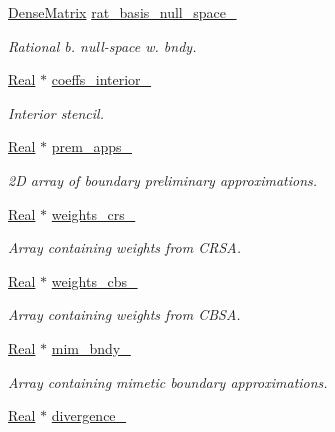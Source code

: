 \begin{DoxyCompactItemize}
\hyperlink{classmtk_1_1DenseMatrix}{Dense\+Matrix} \hyperlink{classmtk_1_1Div1D_a4f0f5589f13024b7e0edc2ac19649f9b}{rat\+\_\+basis\+\_\+null\+\_\+space\+\_\+}
\begin{DoxyCompactList}\small\item\em Rational b. null-\/space w. bndy. \end{DoxyCompactList}\item 
\hyperlink{group__c01-roots_gac080bbbf5cbb5502c9f00405f894857d}{Real} $\ast$ \hyperlink{classmtk_1_1Div1D_a7c7688d8ac25120587353ece4e93a13a}{coeffs\+\_\+interior\+\_\+}
\begin{DoxyCompactList}\small\item\em Interior stencil. \end{DoxyCompactList}\item 
\hyperlink{group__c01-roots_gac080bbbf5cbb5502c9f00405f894857d}{Real} $\ast$ \hyperlink{classmtk_1_1Div1D_ab51ff3db86a874604d6c756ab6770950}{prem\+\_\+apps\+\_\+}
\begin{DoxyCompactList}\small\item\em 2\+D array of boundary preliminary approximations. \end{DoxyCompactList}\item 
\hyperlink{group__c01-roots_gac080bbbf5cbb5502c9f00405f894857d}{Real} $\ast$ \hyperlink{classmtk_1_1Div1D_ad36dcfade921f0488fe3edaecc17bd75}{weights\+\_\+crs\+\_\+}
\begin{DoxyCompactList}\small\item\em Array containing weights from C\+R\+S\+A. \end{DoxyCompactList}\item 
\hyperlink{group__c01-roots_gac080bbbf5cbb5502c9f00405f894857d}{Real} $\ast$ \hyperlink{classmtk_1_1Div1D_a631dad42a0ec0f5d5ac767abdfd8949c}{weights\+\_\+cbs\+\_\+}
\begin{DoxyCompactList}\small\item\em Array containing weights from C\+B\+S\+A. \end{DoxyCompactList}\item 
\hyperlink{group__c01-roots_gac080bbbf5cbb5502c9f00405f894857d}{Real} $\ast$ \hyperlink{classmtk_1_1Div1D_a6d6c600117fdb583f061da0c9d5f28f7}{mim\+\_\+bndy\+\_\+}
\begin{DoxyCompactList}\small\item\em Array containing mimetic boundary approximations. \end{DoxyCompactList}\item 
\hyperlink{group__c01-roots_gac080bbbf5cbb5502c9f00405f894857d}{Real} $\ast$ \hyperlink{classmtk_1_1Div1D_a0f96410051ba1fa6d91dfa7b7eacead9}{divergence\+\_\+}

\end{DoxyCompactItemize}
